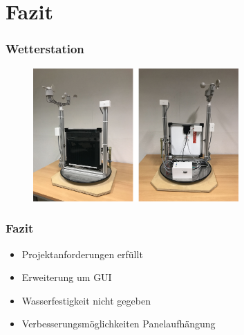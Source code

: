 \documentclass{beamer}
\begin{document}
\section{Fazit}
\begin{frame}
	\frametitle{Wetterstation}
	 \begin{figure}[H]
    		\centering
    		\includegraphics[width=0.7\textwidth]{./img/Wetterstaion_fertig1.JPG}
  	 \end{figure}
\end{frame}

\begin{frame}
	\frametitle{Fazit}
	\begin{itemize}
		\item Projektanforderungen erfüllt
		\item Erweiterung um GUI
		\item Wasserfestigkeit nicht gegeben
		\item Verbesserungsmöglichkeiten Panelaufhängung
	\end{itemize}

\end{frame}



\end{document}
